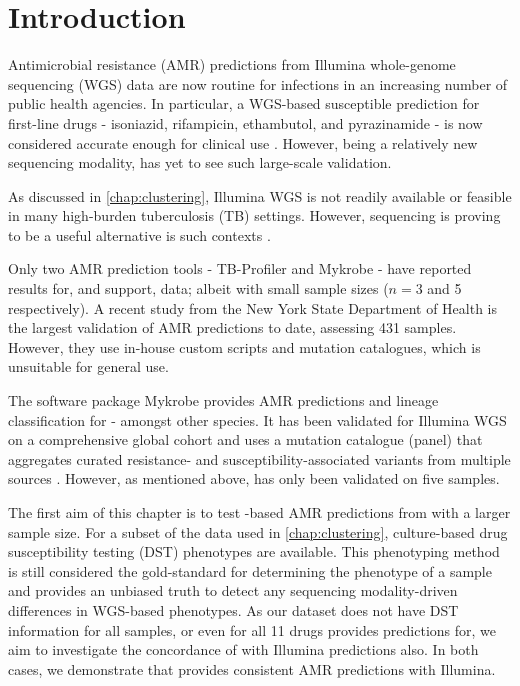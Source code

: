 \section{Introduction}
Antimicrobial resistance (AMR) predictions from Illumina whole-genome sequencing (WGS) data are now routine for \mtb{} infections in an increasing number of public health agencies. In particular, a WGS-based susceptible prediction for first-line drugs - isoniazid, rifampicin, ethambutol, and pyrazinamide - is now considered accurate enough for clinical use \cite{cryptic2018}. However, being a relatively new sequencing modality, \ont{} has yet to see such large-scale validation.

As discussed in \autoref{chap:clustering}, Illumina WGS is not readily available or feasible in many high-burden tuberculosis (TB) settings. However, \ont{} sequencing is proving to be a useful alternative is such contexts \cite{Inzaule2021,faria2016,quick2016,who-ngs2018}. 

Only two \mtb{} AMR prediction tools - TB-Profiler \cite{phelan2019} and Mykrobe \cite{hunt2019} - have reported results for, and support, \ont{} data; albeit with small sample sizes ($n=3$ and 5 respectively). A recent study from the New York State Department of Health is the largest validation of \ont{} AMR predictions to date, assessing 431 samples. However, they use in-house custom scripts and mutation catalogues, which is unsuitable for general use. 

The software package Mykrobe provides AMR predictions and lineage classification for \mtb{} - amongst other species. It has been validated for Illumina WGS on a comprehensive global cohort and uses a mutation catalogue (panel) that aggregates curated resistance- and susceptibility-associated variants from multiple sources \cite{hunt2019}. However, as mentioned above, \mykrobe{} has only been validated on five \ont{} samples.

The first aim of this chapter is to test \ont{}-based AMR predictions from \mykrobe{} with a larger sample size. For a subset of the data used in \autoref{chap:clustering}, culture-based drug susceptibility testing (DST) phenotypes are available. This phenotyping method is still considered the gold-standard for determining the phenotype of a sample and provides an unbiased truth to detect any sequencing modality-driven differences in WGS-based phenotypes. As our dataset does not have DST information for all samples, or even for all 11 drugs \mykrobe{} provides predictions for, we aim to investigate the concordance of \ont{} with Illumina predictions also. In both cases, we demonstrate that \ont{} provides consistent AMR predictions with Illumina.

